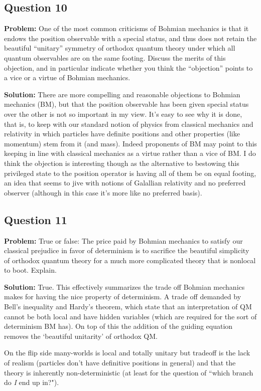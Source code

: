 \documentclass{article}
\begin{document}
\subsection*{Question 10}
\noindent\textbf{Problem:} One of the most common criticisms of Bohmian mechanics is that it endows the position observable with a special status, and thus does not retain the beautiful ``unitary'' symmetry of orthodox quantum theory under which all quantum observables are on the same footing. Discuss the merits of this objection, and in particular indicate whether you think the ``objection'' points to a vice or a virtue of Bohmian mechanics.
\bigskip

\noindent\textbf{Solution:} There are more compelling and reasonable objections to Bohmian mechanics (BM), but that the position observable has been given special status over the other is not so important in my view. It's easy to see why it is done, that is, to keep with our standard notion of physics from classical mechanics and relativity in which particles have definite positions and other properties (like momentum) stem from it (and mass). Indeed proponents of BM may point to this keeping in line with classical mechanics as a virtue rather than a vice of BM. I do think the objection is interesting though as the alternative to bestowing this privileged state to the position operator is having all of them be on equal footing, an idea that seems to jive with notions of Galallian relativity and no preferred observer (although in this case it's more like no preferred basis).

\subsection*{Question 11}
\noindent\textbf{Problem:} True or false: The price paid by Bohmian mechanics to satisfy our classical prejudice in favor of determinism is to sacrifice the beautiful simplicity of orthodox quantum theory for a much more complicated theory that is nonlocal to boot. Explain.
\bigskip

\noindent\textbf{Solution:} True. This effectively summarizes the trade off Bohmian mechanics makes for having the nice property of determinism. A trade off demanded by Bell's inequality and Hardy's theorem, which state that an interpretation of QM cannot be both local and have hidden variables (which are required for the sort of determinism BM has). On top of this the addition of the guiding equation removes the `beautiful unitarity' of orthodox QM.

On the flip side many-worlds is local and totally unitary but  tradeoff is the lack of realism (particles don't have definitive positions in general) and that the theory is inherently non-deterministic (at least for the question of ``which branch do \textit{I} end up in?").
\end{document}

